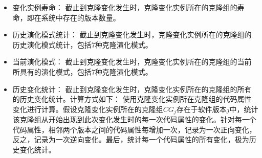\begin{itemize}
\item 
变化实例寿命：
截止到克隆变化发生时，克隆变化实例所在的克隆组的寿命，即在系统中存在的版本数量。
\item 
历史演化模式统计：
截止到克隆变化发生时，克隆变化实例所在的克隆组的历史演化模式统计，包括7种克隆演化模式。
\item 
当前演化模式：
截止到克隆变化发生时，克隆变化实例所在的克隆组的当前所具有的演化模式，包括7种克隆演化模式。
\item 
历史变化统计：
截止到克隆变化发生时，克隆变化实例所在的克隆组的所有的历史变化统计。计算方式如下： 使用克隆变化实例所在克隆组的代码属性变化进行计算。假设克隆变化实例所在的克隆组$CG_j$存在于软件版本$j$中，统计该克隆组从开始出现到此次变化发生时的每一次代码属性的变化。针对每一个代码属性，相邻两个版本之间的代码属性每增加一次，记录为一次正向变化，反之，记录为一次逆向变化。最后，统计每一个代码属性的所有变化，极为历史变化统计。
\end{itemize}




